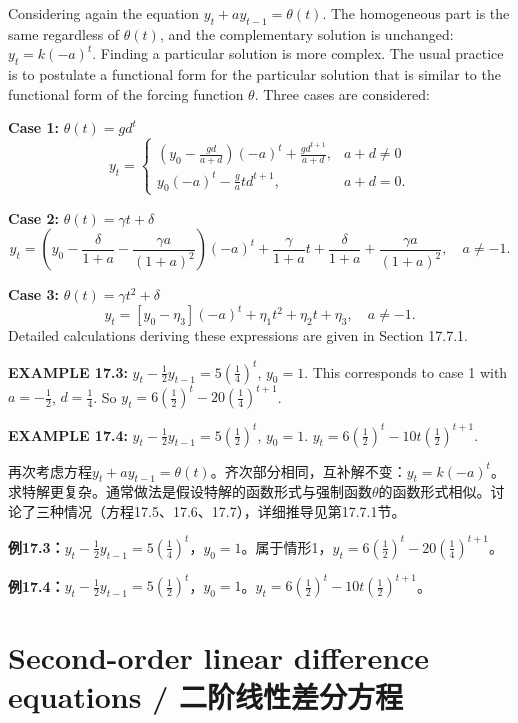 \begin{original}
Considering again the equation $y_t + a y_{t-1} = \theta(t)$. The homogeneous part is the same regardless of $\theta(t)$, and the complementary solution is unchanged: $y_t = k(-a)^t$. Finding a particular solution is more complex. The usual practice is to postulate a functional form for the particular solution that is similar to the functional form of the forcing function $\theta$. Three cases are considered:

\textbf{Case 1:} $\theta(t) = g d^t$
\[
y_t = \begin{cases}
\left(y_0 - \frac{gd}{a+d}\right)(-a)^t + \frac{gd^{t+1}}{a+d}, & a + d \neq 0\\[4pt]
y_0(-a)^t - \frac{g}{a} t d^{t+1}, & a + d = 0.
\end{cases} \tag{17.5}
\]

\textbf{Case 2:} $\theta(t) = \gamma t + \delta$
\[
y_t = \left(y_0 - \frac{\delta}{1+a} - \frac{\gamma a}{(1+a)^2}\right)(-a)^t + \frac{\gamma}{1+a}t + \frac{\delta}{1+a} + \frac{\gamma a}{(1+a)^2}, \quad a \neq -1. \tag{17.6}
\]

\textbf{Case 3:} $\theta(t) = \gamma t^2 + \delta$
\[
y_t = [y_0 - \eta_3](-a)^t + \eta_1 t^2 + \eta_2 t + \eta_3, \quad a \neq -1. \tag{17.7}
\]
Detailed calculations deriving these expressions are given in Section 17.7.1.

\textbf{EXAMPLE 17.3:} $y_t - \frac{1}{2} y_{t-1} = 5(\frac{1}{4})^t$, $y_0 = 1$. This corresponds to case 1 with $a = -\frac{1}{2}$, $d = \frac{1}{4}$. So $y_t = 6(\frac{1}{2})^t - 20(\frac{1}{4})^{t+1}$.

\textbf{EXAMPLE 17.4:} $y_t - \frac{1}{2} y_{t-1} = 5(\frac{1}{2})^t$, $y_0 = 1$. $y_t = 6(\frac{1}{2})^t - 10t(\frac{1}{2})^{t+1}$.
\end{original}
\begin{translation}
再次考虑方程$y_t + a y_{t-1} = \theta(t)$。齐次部分相同，互补解不变：$y_t = k(-a)^t$。求特解更复杂。通常做法是假设特解的函数形式与强制函数$\theta$的函数形式相似。讨论了三种情况（方程17.5、17.6、17.7），详细推导见第17.7.1节。

\textbf{例17.3：}$y_t - \frac{1}{2} y_{t-1} = 5(\frac{1}{4})^t$，$y_0 = 1$。属于情形1，$y_t = 6(\frac{1}{2})^t - 20(\frac{1}{4})^{t+1}$。

\textbf{例17.4：}$y_t - \frac{1}{2} y_{t-1} = 5(\frac{1}{2})^t$，$y_0 = 1$。$y_t = 6(\frac{1}{2})^t - 10t(\frac{1}{2})^{t+1}$。
\end{translation}
\section{Second-order linear difference equations / 二阶线性差分方程}

